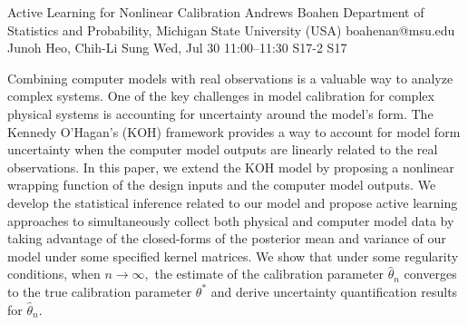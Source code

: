\documentclass[12pt,lettersize,oneside]{book} %
\begin{document}
\begin{talk}
  {Active Learning for Nonlinear Calibration}%
  {Andrews Boahen}%
  {Department of Statistics and Probability, Michigan State University (USA)}%
  {boahenan@msu.edu}%
  {Junoh Heo, Chih-Li Sung}%
  {}%
  {Wed, Jul 30 11:00--11:30}%
  {S17-2}%
  {S17}%
  
    
   
Combining computer models with real observations is a valuable way to analyze complex systems. One of the key challenges in model calibration for complex physical systems is accounting for uncertainty around the model's form. The Kennedy O'Hagan's (KOH) framework provides a way to account for model form uncertainty when the computer model outputs are linearly related to the real observations. In this paper, we extend the KOH model by proposing a nonlinear wrapping function of the design inputs and the computer model outputs. We develop the statistical inference related to our model and propose active learning approaches to simultaneously collect both physical and computer model data by taking advantage of the closed-forms of the posterior mean and variance of our model under some specified kernel matrices. We show that under some regularity conditions, when $n\rightarrow\infty,$ the estimate of the calibration parameter $\hat{\theta}_n$ converges  to  the true calibration parameter $\theta^*$ and derive uncertainty quantification results for $\hat{\theta}_n.$
\medskip


\end{talk}
\end{document}
